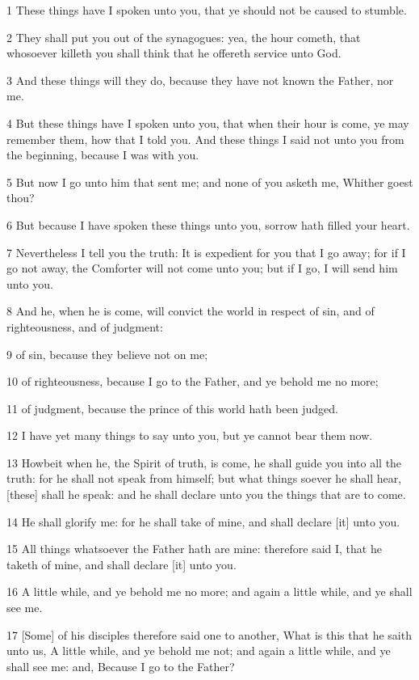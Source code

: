 \par 1 These things have I spoken unto you, that ye should not be caused to stumble.
\par 2 They shall put you out of the synagogues: yea, the hour cometh, that whosoever killeth you shall think that he offereth service unto God.
\par 3 And these things will they do, because they have not known the Father, nor me.
\par 4 But these things have I spoken unto you, that when their hour is come, ye may remember them, how that I told you. And these things I said not unto you from the beginning, because I was with you.
\par 5 But now I go unto him that sent me; and none of you asketh me, Whither goest thou?
\par 6 But because I have spoken these things unto you, sorrow hath filled your heart.
\par 7 Nevertheless I tell you the truth: It is expedient for you that I go away; for if I go not away, the Comforter will not come unto you; but if I go, I will send him unto you.
\par 8 And he, when he is come, will convict the world in respect of sin, and of righteousness, and of judgment:
\par 9 of sin, because they believe not on me;
\par 10 of righteousness, because I go to the Father, and ye behold me no more;
\par 11 of judgment, because the prince of this world hath been judged.
\par 12 I have yet many things to say unto you, but ye cannot bear them now.
\par 13 Howbeit when he, the Spirit of truth, is come, he shall guide you into all the truth: for he shall not speak from himself; but what things soever he shall hear, [these] shall he speak: and he shall declare unto you the things that are to come.
\par 14 He shall glorify me: for he shall take of mine, and shall declare [it] unto you.
\par 15 All things whatsoever the Father hath are mine: therefore said I, that he taketh of mine, and shall declare [it] unto you.
\par 16 A little while, and ye behold me no more; and again a little while, and ye shall see me.
\par 17 [Some] of his disciples therefore said one to another, What is this that he saith unto us, A little while, and ye behold me not; and again a little while, and ye shall see me: and, Because I go to the Father?
